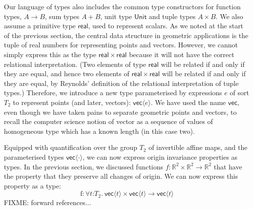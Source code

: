 Our language of types also includes the common type constructors for
function types, $A \to B$, sum types $A + B$, unit type
$\mathsf{Unit}$ and tuple types $A \times B$. We also assume a
primitive type $\mathsf{real}$, used to represent scalars. As we noted
at the start of the previous section, the central data structure in
geometric applications is the tuple of real numbers for representing
points and vectors. However, we cannot simply express this as the type
$\mathsf{real} \times \mathsf{real}$ because it will not have the
correct relational interpretation. (Two elements of type
$\mathsf{real}$ will be related if and only if they are equal, and
hence two elements of $\mathsf{real} \times \mathsf{real}$ will be
related if and only if they are equal, by Reynolds' definition of the
relational interpretation of tuple types.) Therefore, we introduce a
new type parameterised by expressions $e$ of sort $T_2$ to represent
points (and later, vectors): $\mathsf{vec}\langle e \rangle$. We have
used the name $\mathsf{vec}$, even though we have taken pains to
separate geometric points and vectors, to recall the computer science
notion of vector as a sequence of values of homogeneous type which has
a known length (in this case two).


Equipped with quantification over the group $T_2$ of invertible affine
maps, and the parameterised types $\mathsf{vec}\langle \cdot \rangle$,
we can now express origin invariance properties as types. In the
previous section, we discussed functions $f : \mathbb{R}^2 \times
\mathbb{R}^2 \to \mathbb{R}^2$ that have the property that they
preserve all changes of origin. We can now express this property as a
type:
\begin{displaymath}
  \mathrm{f} : \forall t \mathord: T_2.\ \mathsf{vec}\langle t \rangle \times \mathsf{vec}\langle t \rangle \to \mathsf{vec}\langle t \rangle
\end{displaymath}
FIXME: forward references...


